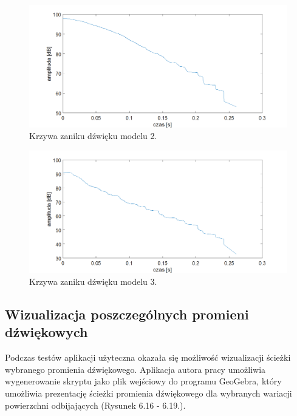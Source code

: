 \begin{figure}[H]
        \centering
                \centering
                \includegraphics[width=16cm]{zanikz2}
	\caption{Krzywa zaniku dźwięku modelu 2.}
\end{figure}

\begin{figure}[H]
        \centering
                \centering
                \includegraphics[width=16cm]{zanikz3}
	\caption{Krzywa zaniku dźwięku modelu 3.}
\end{figure}


\subsection{Wizualizacja poszczególnych promieni dźwiękowych}\label{sec:imstest2}

Podczas testów aplikacji użyteczna okazała się możliwość wizualizacji ścieżki wybranego promienia dźwiękowego. Aplikacja autora pracy umożliwia wygenerowanie skryptu jako plik wejściowy do programu GeoGebra, który umożliwia prezentację ścieżki promienia dźwiękowego dla wybranych wariacji powierzchni odbijających (Rysunek 6.16 - 6.19.).  

